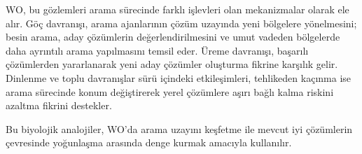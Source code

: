 WO, bu gözlemleri arama sürecinde farklı işlevleri olan mekanizmalar
olarak ele alır. Göç davranışı, arama ajanlarının çözüm uzayında yeni
bölgelere yönelmesini; besin arama, aday çözümlerin değerlendirilmesini
ve umut vadeden bölgelerde daha ayrıntılı arama yapılmasını temsil eder.
Üreme davranışı, başarılı çözümlerden yararlanarak yeni aday çözümler
oluşturma fikrine karşılık gelir. Dinlenme ve toplu davranışlar sürü
içindeki etkileşimleri, tehlikeden kaçınma ise arama sürecinde konum
değiştirerek yerel çözümlere aşırı bağlı kalma riskini azaltma fikrini
destekler.

Bu biyolojik analojiler, WO'da arama uzayını keşfetme
ile mevcut iyi çözümlerin çevresinde yoğunlaşma
arasında denge kurmak amacıyla kullanılır.